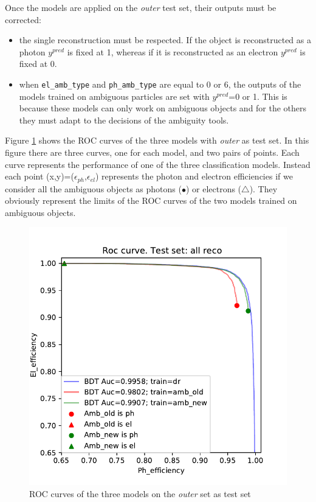 \documentclass[a4paper, oneside, 11pt, openright]{book}
\begin{document}
			Once the models are applied on the \textit{outer} test set, their outputs must be corrected:
			\begin{itemize}
				\item the single reconstruction must be respected. If the object is reconstructed as a photon $y^{pred}$ is fixed at 1, whereas if it is reconstructed as an electron $y^{pred}$ is fixed at 0.
				\item when \texttt{el\_amb\_type} and \texttt{ph\_amb\_type} are equal to 0 or 6, the outputs of the models trained on ambiguous particles are set with $y^{pred}$=0 or 1. This is because these models can only work on ambiguous objects and for the others they must adapt to the decisions of the ambiguity tools.
			\end{itemize}
			
			Figure \ref{fig:last_roc} shows the ROC curves of the three models with \textit{outer} as test set. In this figure there are three curves, one for each model, and two pairs of points. Each curve represents the performance of one of the three classification models. Instead each point (x,y)=($\epsilon_{ph}$,$\epsilon_{el}$) represents the photon and electron efficiencies if we consider all the ambiguous objects as photons ($\bullet$) or electrons ($\triangle$). They obviously represent the limits of the ROC curves of the two models trained on ambiguous objects.
			
			\begin{figure}
				\centering
				\includegraphics[width=.65\linewidth]{tesi_images/all_amb_roc.pdf} 
				\caption{ROC curves of the three models on the \textit{outer} set as test set} 
				\label{fig:last_roc}
			\end{figure}
		
\end{document}
